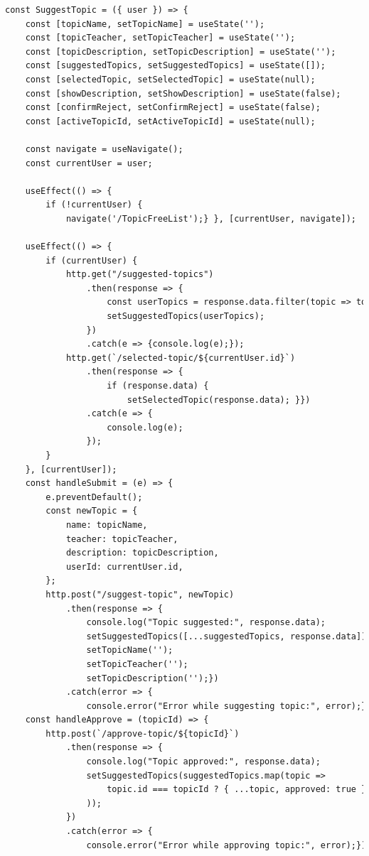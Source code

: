 \documentclass[14pt]{extarticle} %
\begin{document}
\label{suggestTopic}

\begin{lstlisting}[language=html, caption={Клиентская часть SuggestTopic}]
const SuggestTopic = ({ user }) => {
    const [topicName, setTopicName] = useState('');
    const [topicTeacher, setTopicTeacher] = useState('');
    const [topicDescription, setTopicDescription] = useState('');
    const [suggestedTopics, setSuggestedTopics] = useState([]);
    const [selectedTopic, setSelectedTopic] = useState(null);
    const [showDescription, setShowDescription] = useState(false);
    const [confirmReject, setConfirmReject] = useState(false);
    const [activeTopicId, setActiveTopicId] = useState(null); 

    const navigate = useNavigate();
    const currentUser = user;

    useEffect(() => {
        if (!currentUser) {
            navigate('/TopicFreeList');} }, [currentUser, navigate]);

    useEffect(() => {
        if (currentUser) {
            http.get("/suggested-topics")
                .then(response => {
                    const userTopics = response.data.filter(topic => topic.userId === currentUser.id);
                    setSuggestedTopics(userTopics);
                })
                .catch(e => {console.log(e);});
            http.get(`/selected-topic/${currentUser.id}`)
                .then(response => {
                    if (response.data) {
                        setSelectedTopic(response.data); }})
                .catch(e => {
                    console.log(e);
                });
        }
    }, [currentUser]);
    const handleSubmit = (e) => {
        e.preventDefault();
        const newTopic = {
            name: topicName,
            teacher: topicTeacher,
            description: topicDescription,
            userId: currentUser.id,
        };
        http.post("/suggest-topic", newTopic)
            .then(response => {
                console.log("Topic suggested:", response.data);
                setSuggestedTopics([...suggestedTopics, response.data]);
                setTopicName('');
                setTopicTeacher('');
                setTopicDescription('');})
            .catch(error => {
                console.error("Error while suggesting topic:", error);});};
    const handleApprove = (topicId) => {
        http.post(`/approve-topic/${topicId}`)
            .then(response => {
                console.log("Topic approved:", response.data);
                setSuggestedTopics(suggestedTopics.map(topic =>
                    topic.id === topicId ? { ...topic, approved: true } : topic
                ));
            })
            .catch(error => {
                console.error("Error while approving topic:", error);}); };


\end{lstlisting}
\end{document}
